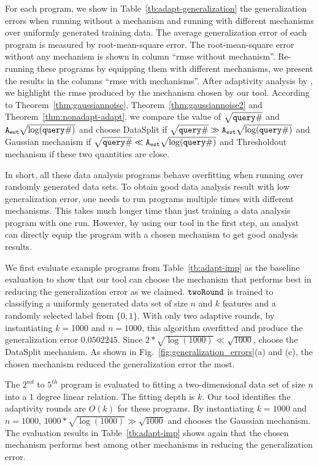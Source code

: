 For each program, we show in Table~\ref{tb:adapt-generalization} the generalization errors when running without a mechanism
and running with different mechanisms over uniformly generated training data.
The average generalization error of each program is measured by root-mean-square error.
The root-mean-square error without any mechanism is shown in column ``rmse without mechanism''.
Re-running these programs by equipping them with different mechanisms, we present the results
in the columns ``rmse with mechanisms''.
After adaptivity analysis by {\THESYSTEM}, we highlight the rmse produced by the mechanism chosen by our tool.
According to Theorem~\ref{thm:gaussiannoise}, Theorem~\ref{thm:gaussiannoise2} and Theorem~\ref{thm:nonadapt-adapt}.
we compare the value of $\sqrt{{\tt query} \#}$ and ${\mathtt{A_{est}}}\sqrt{\log({\tt query} \#)}$
and choose DataSplit if $\sqrt{{\tt query} \#} \gg {\ensuremath{\mathtt{A_{est}}}}\sqrt{\log({\tt query} \#)}$ and Gaussian mechanism if
$\sqrt{{\tt query} \#} \ll {\ensuremath{\mathtt{A_{est}}}}\sqrt{\log({\tt query} \#)}$ and Thresholdout mechanism if these two quantities are close.

In short, all these data analysis programs behave overfitting when running over randomly generated data sets. 
To obtain good data analysis result with low generalization error,
one needs to run programs multiple times with different mechanisms.
This takes much longer time than just training a data analysis program with one run.
However, by using our tool in the first step, an analyst can directly equip the program with a chosen mechanism to get good
analysis results.


We first evaluate example programs from Table~\ref{tb:adapt-imp} as the baseline evaluation to show that our tool can choose the mechanism that performs best in reducing the generalization error as we claimed.
$\mathtt{twoRound}$ is trained to classifying a uniformly generated data set of size $n$ and $k$ features and a randomly selected label from $\{0, 1\}$. 
With only two adaptive rounds, by instantiating $k = 1000$ and $n = 1000$, this algorithm overfitted and produce the generalization error 
$0.0502245$.
Since $2* \sqrt{\log(1000)} \ll \sqrt{1000}$, \THESYSTEM choose the DataSplit mechanism.
As shown in Fig.~\ref{fig:generalization_errors}(a) and (c),
the chosen mechanism reduced the generalization error the most.

The $2^{nd}$ to $5^{th}$ program is evaluated to fitting a two-dimensional data set of size $n$ into a $1$ degree linear relation.
The fitting depth is $k$.
Our tool identifies the adaptivity rounds are $O(k)$ for these programs.
By instantiating $k = 1000$ and $n = 1000$, 
$1000* \sqrt{\log(1000)} \gg \sqrt{1000}$ and chooses the Gaussian mechanism.
The evaluation results in Table~\ref{tb:adapt-imp} shows again that the chosen mechanism performs best among other mechanisms in reducing the generalization error.

